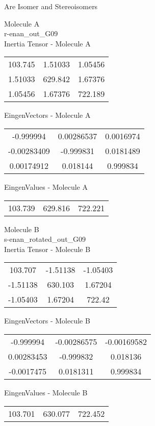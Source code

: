 \begin{center}
\vtab
\vtab
\textcolor{NavyBlue}{\Large Are Isomer and Stereoisomers}
\end{center}
\newpage
\begin{multicols}{2}
\begin{center}
Molecule A \\ 
r-enan\_out\_G09
\\
Inertia Tensor - Molecule A \\
\vtab
\begin{tabular}{|c c c|}
103.745	 & 	1.51033	 & 	1.05456	 \\
1.51033	 & 	629.842	 & 	1.67376	 \\
1.05456	 & 	1.67376	 & 	722.189
\end{tabular}

\vtab
 EingenVectors - Molecule A     \\
\vtab
\begin{tabular}{|c c c|}
-0.999994	 & 	0.00286537	 & 	0.0016974	 \\
-0.00283409	 & 	-0.999831	 & 	0.0181489	 \\
0.00174912	 & 	0.018144	 & 	0.999834
\end{tabular}

\vtab
 EingenValues - Molecule A     \\
\vtab
\begin{tabular}{|c c c|}
103.739	 & 	629.816	 & 	722.221
\end{tabular}
\columnbreak

Molecule B \\ 
s-enan\_rotated\_out\_G09
\\
Inertia Tensor - Molecule B \\
\vtab
\begin{tabular}{|c c c|}
103.707	 & 	-1.51138	 & 	-1.05403	 \\
-1.51138	 & 	630.103	 & 	1.67204	 \\
-1.05403	 & 	1.67204	 & 	722.42
\end{tabular}

\vtab
 EingenVectors - Molecule B     \\
\vtab
\begin{tabular}{|c c c|}
-0.999994	 & 	-0.00286575	 & 	-0.00169582	 \\
0.00283453	 & 	-0.999832	 & 	0.018136	 \\
-0.0017475	 & 	0.0181311	 & 	0.999834
\end{tabular}

\vtab
 EingenValues - Molecule B     \\
\vtab
\begin{tabular}{|c c c|}
103.701	 & 	630.077	 & 	722.452
\end{tabular}

\end{center}
\end{multicols}
